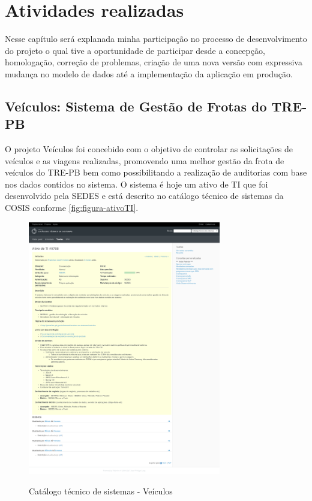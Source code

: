 
\chapter{Atividades realizadas}
\label{chap:atividadesRealizadas}

Nesse capítulo será explanada minha participação no processo de desenvolvimento do projeto o qual tive a oportunidade de participar desde a concepção, homologação, correção de problemas, criação de uma nova versão com expressiva mudança no modelo de dados até a implementação da aplicação em produção.

\section{Veículos: Sistema de Gestão de Frotas do TRE-PB}
\label{sec:atividadesRealizadasVeiculos}

O projeto Veículos foi concebido com o objetivo de controlar as solicitações de veículos e as viagens realizadas, promovendo uma melhor gestão da frota de veículos do TRE-PB bem como possibilitando a realização de auditorias com base nos dados contidos no sistema.
O sistema é hoje um ativo de TI que foi desenvolvido pela SEDES e está descrito no catálogo técnico de sistemas da COSIS conforme \autoref{fig:figura-ativoTI}. 

\begin{figure}[!htb]
    \centering
    \caption{Catálogo técnico de sistemas - Veículos}
    \includegraphics[width=0.75\textwidth]{./dados/figuras/veiculos-ativoTI}
    \label{fig:figura-ativoTI}
\end{figure}

